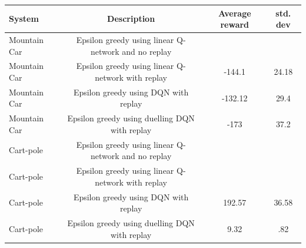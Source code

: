 \documentclass[12pt]{article}
\begin{document}
\begin{center}
\begin{tabular}{|l||c|c|c|}\hline
	System & Description &Average reward & std. dev\\\hline
	Mountain Car & Epsilon greedy using linear Q-network and no replay & &\\ \hline
	Mountain Car & Epsilon greedy using linear Q-network with replay & -144.1 & 24.18 \\ \hline
	Mountain Car & Epsilon greedy using DQN with replay & -132.12 & 29.4\\ \hline
	Mountain Car & Epsilon greedy using duelling DQN with replay & -173 & 37.2\\ \hline
	
	Cart-pole & Epsilon greedy using linear Q-network and no replay & &\\ \hline
	Cart-pole & Epsilon greedy using linear Q-network with replay & &  \\ \hline
	Cart-pole & Epsilon greedy using DQN with replay & 192.57 & 36.58\\ \hline
	Cart-pole & Epsilon greedy using duelling DQN with replay & 9.32 & .82\\ \hline
\end{tabular}
\end{center}
\end{document}
